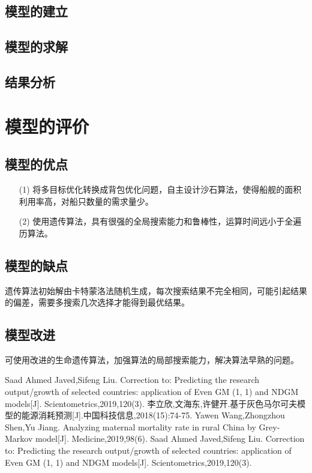 \documentclass{whutmod}
\begin{document}
     
     
     \subsection{模型的建立}
     
     
     
     
     \subsection{模型的求解}   
     
     
     \subsection{结果分析}
	\section{模型的评价}
	\subsection{模型的优点}
		\begin{itemize}                                             

		\item [(1)] 将多目标优化转换成背包优化问题，自主设计沙石算法，使得船舰的面积利用率高，对船只数量的需求量少。
		\item [(2)] 使用遗传算法，具有很强的全局搜索能力和鲁棒性，运算时间远小于全遍历算法。
	\end{itemize}
	\subsection{模型的缺点}

	遗传算法初始解由卡特蒙洛法随机生成，每次搜索结果不完全相同，可能引起结果的偏差，需要多搜索几次选择才能得到最优结果。
	\subsection{模型改进}
	可使用改进的生命遗传算法，加强算法的局部搜索能力，解决算法早熟的问题。

 
	\newpage	%
	\nocite{*}		%
%
%	
\begin{thebibliography}{9}%
	Saad Ahmed Javed,Sifeng Liu. Correction to: Predicting the research output/growth of selected countries: application of Even GM (1, 1) and NDGM models[J]. Scientometrics,2019,120(3).
	李立欣,文海东,许健开.基于灰色马尔可夫模型的能源消耗预测[J].中国科技信息,2018(15):74-75.	
	Yawen Wang,Zhongzhou Shen,Yu Jiang. Analyzing maternal mortality rate in rural China by Grey-Markov model[J]. Medicine,2019,98(6).
	Saad Ahmed Javed,Sifeng Liu. Correction to: Predicting the research output/growth of selected countries: application of Even GM (1, 1) and NDGM models[J]. Scientometrics,2019,120(3).

\end{thebibliography}
\end{document}
